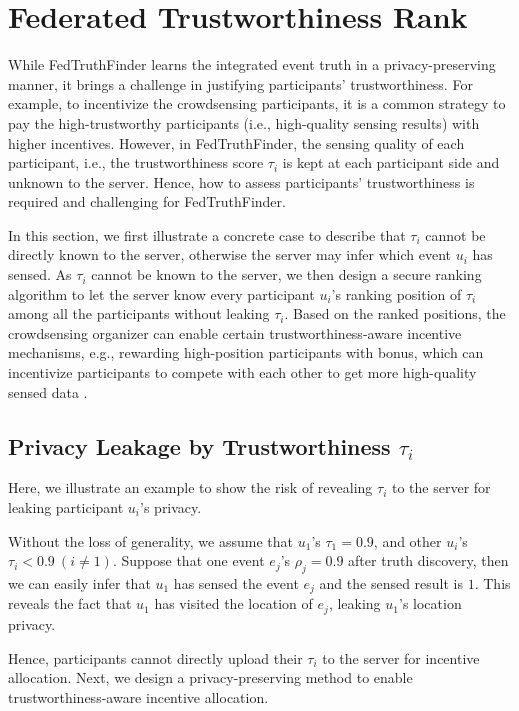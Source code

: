 \section{Federated Trustworthiness Rank}
\label{sec:trust_ranking}

While FedTruthFinder learns the integrated event truth in a privacy-preserving manner, it brings a challenge in justifying participants' trustworthiness. For example, to incentivize the crowdsensing participants, it is a common strategy to pay the high-trustworthy participants (i.e., high-quality sensing results) with higher incentives. However, in FedTruthFinder, the sensing quality of each participant, i.e., the trustworthiness score $\tau_i$ is kept at each participant side and unknown to the server. Hence, how to assess participants' trustworthiness is required and challenging for FedTruthFinder.

In this section, we first illustrate a concrete case to describe that $\tau_i$ cannot be directly known to the server, otherwise the server may infer which event $u_i$ has sensed. As $\tau_i$ cannot be known to the server, we then design a secure ranking algorithm to let the server know every participant $u_i$'s ranking position of $\tau_i$ among all the participants without leaking $\tau_i$. Based on the ranked positions, the crowdsensing organizer can enable certain trustworthiness-aware incentive mechanisms, e.g., rewarding high-position participants with bonus, which can incentivize participants to compete with each other to get more high-quality sensed data \citep{Reddy2010ExaminingMF}.

\subsection{Privacy Leakage by Trustworthiness $\tau_i$}

Here, we illustrate an example to show the risk of revealing $\tau_i$ to the server for leaking participant $u_i$'s privacy.

Without the loss of generality, we assume that $u_1$'s $\tau_1 = 0.9$, and other $u_i$'s $\tau_i < 0.9\ (i\not=1)$. Suppose that one event $e_j$'s $\rho_j = 0.9$ after truth discovery, then we can easily infer that $u_1$ has sensed the event $e_j$ and the sensed result is $1$. This reveals the fact that $u_1$ has visited the location of $e_j$, leaking $u_1$'s location privacy.

Hence, participants cannot directly upload their $\tau_i$ to the server for incentive allocation. Next, we design a privacy-preserving method to enable trustworthiness-aware incentive allocation.

